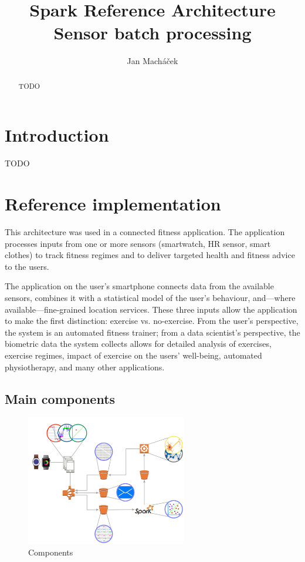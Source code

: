 \documentclass[a4paper, 10 pt, conference]{IEEEtran}
\title{Spark Reference Architecture \\ Sensor batch processing}
\author{Jan Mach{\'a}\v{c}ek%
}
\begin{document}
\maketitle
\thispagestyle{empty}
\pagestyle{empty}

\begin{abstract}

TODO

\end{abstract}


\section{Introduction}

TODO

\section{Reference implementation}

This architecture was used in a connected fitness application. The application processes inputs from one or more sensors (smartwatch, HR sensor, smart clothes) to track fitness regimes and to deliver targeted health and fitness advice to the users. 

The application on the user's smartphone connects data from the available sensors, combines it with a statistical model of the user's behaviour, and---where available---fine-grained location services. These three inputs allow the application to make the first distinction: exercise vs. no-exercise. From the user's perspective, the system is an automated fitness trainer; from a data scientist's perspective, the biometric data the system collects allows for detailed analysis of exercises, exercise regimes, impact of exercise on the users' well-being, automated physiotherapy, and many other applications.

\subsection{Main components}

\begin{figure}[hb]
	\begin{center}
		\caption{Components}
		\label{fig:components}
		\includegraphics[width=7cm,keepaspectratio]{ri-arch.png}
	\end{center}
\end{figure}
\end{document}
